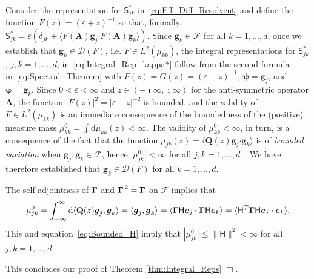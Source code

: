 \documentclass[leqno,onefignum,onetabnum]{siamltex1213}
\renewcommand{\d}{\mathrm{d}}
\newcommand{\Ab}{\mathbf{A}}
\newcommand{\Qb}{\mathbf{Q}}
\newcommand{\Fc}{\mathcal{F}}
\newcommand{\Hm}{\mathsf{H}}
\newcommand{\Sm}{\mathsf{S}}
\newcommand{\Ds}{\mathscr{D}}
\newcommand\bGamma{\mbox{\boldmath${\Gamma}$}}
\providecommand\bcdot{\boldsymbol{\cdot}}
\newcommand{\vecg}{\boldsymbol{g}}
\newcommand{\vece}{\boldsymbol{e}}
\newcommand{\vecpsi}{\boldsymbol{\psi}}
\newcommand{\vecvarphi}{\boldsymbol{\varphi}}
\begin{document}
Consider the representation for $\Sm^*_{jk}$
in~\eqref{eq:Eff_Diff_Resolvent} and define the function 
$F(z)=(\varepsilon+z)^{-1}$ so that, formally,
$\Sm^*_{jk}=\varepsilon(\delta_{jk}+\langle F(\Ab)\vecg_j\bcdot F(\Ab)\vecg_k\rangle)$. Since
$\vecg_k\in\Fc$ for all $k=1,\ldots,d$, once we establish that
$\vecg_k\in\Ds(F)$, i.e. $F\in L^2(\mu_{kk})$, the integral representations
for $\Sm^*_{jk}$, $j,k=1,\ldots,d$, in~\eqref{eq:Integral_Rep_kappa*} follow
from the second formula in~\eqref{eq:Spectral_Theorem} with
$F(z)=G(z)=(\varepsilon+z)^{-1}$, $\vecpsi=\vecg_j$, and
$\vecvarphi=\vecg_k$. Since $0<\varepsilon<\infty$ and 
$z\in(-\imath\infty,\imath\infty)$ for the anti-symmetric operator $\Ab$, the function
$|F(z)|^2=|\varepsilon+z|^{-2}$ is bounded, and the validity of $F\in L^2(\mu_{kk})$ is
an immediate consequence of the boundedness of the (positive) measure
mass $\mu^0_{kk}=\int\d\mu_{kk}(z)<\infty$. The validity of $\mu^0_{kk}<\infty$, in turn,
is a consequence of the fact that the function
$\mu_{jk}(z)=\langle\Qb(z)\vecg_j\bcdot\vecg_k\rangle$ is of \emph{bounded
  variation} when $\vecg_j,\vecg_k\in\Fc$, hence
$|\mu^0_{jk}|<\infty$ for all $j,k=1,\ldots,d$~\cite{Stone:64}. We have therefore
established that $\vecg_k\in\Ds(F)$ for all $k=1,\ldots,d$.     




The self-adjointness of $\bGamma$
and $\bGamma^{\,2}=\bGamma$ on $\Fc$ implies that   
%
\begin{align}\label{eq:Mass}
  \mu^0_{jk}%
        =\int_{-\infty}^\infty\d\langle\Qb(z)\vecg_j,\vecg_k\rangle
        =\langle\vecg_j,\vecg_k\rangle
        =\langle\bGamma\Hm\vece _j\bcdot\bGamma\Hm\vece _k\rangle 
        =\langle\Hm^T\bGamma\Hm\vece _j\bcdot\vece _k\rangle.     
\end{align}
%
This and equation~\eqref{eq:Bounded_H} imply that
$|\mu^0_{jk}|\leq\|\Hm\|^2<\infty$ for all $j,k=1,\ldots,d$.  











This concludes our proof of Theorem
\ref{thm:Integral_Reps} $\Box$.    
\end{document}
